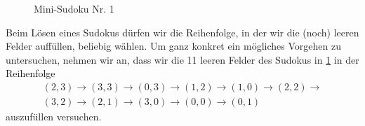 \begin{figure}[H]
  \centering
  \caption{Mini-Sudoku Nr. 1}
  \label{fig:Mini1}
\end{figure}
\noindent
Beim Lösen eines Sudokus dürfen wir die Reihenfolge, in der wir die (noch) leeren Felder auffüllen, beliebig wählen. Um ganz konkret ein mögliches Vorgehen zu untersuchen, nehmen wir an, dass wir die 11 leeren Felder des Sudokus in \cref{fig:Mini1} in der Reihenfolge
\begin{align*}
  (2,3)\rightarrow (3,3)\rightarrow (0,3)\rightarrow (1,2)\rightarrow (1,0)\rightarrow (2,2)\rightarrow\\
   (3,2)\rightarrow (2,1)\rightarrow (3,0)\rightarrow (0,0)\rightarrow (0,1)
\end{align*}
auszufüllen versuchen.


